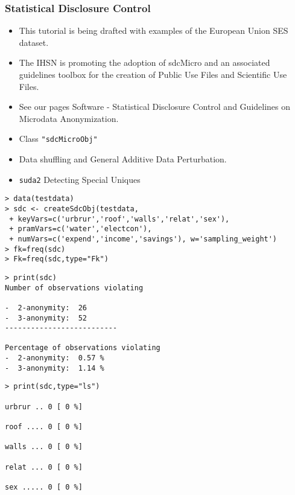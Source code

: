 \documentclass[SDCmaster.tex]{subfiles}
\begin{document}
\begin{frame}
	\frametitle{Statistical Disclosure Control}
	\begin{itemize}
\item This tutorial is being drafted with examples of the European Union SES dataset.
\item The IHSN is promoting the adoption of sdcMicro and an associated guidelines toolbox for the creation of Public Use Files and Scientific Use Files.
\item See our pages Software - Statistical Disclosure Control and Guidelines on Microdata Anonymization.
	\end{itemize}

\end{frame}
\begin{frame}
	\begin{itemize}
\item Class \texttt{"sdcMicroObj"}
\item Data shuffling and General Additive Data Perturbation.
\item \texttt{suda2} Detecting Special Uniques
	\end{itemize}


\end{frame}
\begin{frame}[fragile]
\begin{verbatim}
> data(testdata)
> sdc <- createSdcObj(testdata,
 + keyVars=c('urbrur','roof','walls','relat','sex'),
 + pramVars=c('water','electcon'),
 + numVars=c('expend','income','savings'), w='sampling_weight')
> fk=freq(sdc)
> Fk=freq(sdc,type="Fk")
\end{verbatim}
\end{frame}
\begin{frame}[fragile]
\begin{verbatim}
> print(sdc)
Number of observations violating

-  2-anonymity:  26 
-  3-anonymity:  52 
--------------------------

Percentage of observations violating
-  2-anonymity:  0.57 % 
-  3-anonymity:  1.14 % 
\end{verbatim}
\end{frame}
\begin{frame}[fragile]
\begin{verbatim}
> print(sdc,type="ls")

urbrur .. 0 [ 0 %]

roof .... 0 [ 0 %]

walls ... 0 [ 0 %]

relat ... 0 [ 0 %]

sex ..... 0 [ 0 %]
\end{verbatim}
\end{frame}
\end{document}
